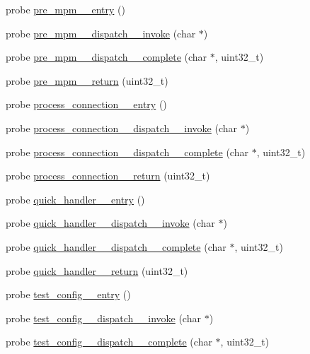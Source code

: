 \begin{DoxyCompactItemize}
probe \hyperlink{apache__probes_8d_acef3144996c242806ff5b2fd6e056fa8}{pre\+\_\+mpm\+\_\+\+\_\+entry} ()
\item 
probe \hyperlink{apache__probes_8d_a305befda60b54d2afe0d12da5d9b9c63}{pre\+\_\+mpm\+\_\+\+\_\+dispatch\+\_\+\+\_\+invoke} (char $\ast$)
\item 
probe \hyperlink{apache__probes_8d_aa11a7675928873dc6046e3c9345983a6}{pre\+\_\+mpm\+\_\+\+\_\+dispatch\+\_\+\+\_\+complete} (char $\ast$, uint32\+\_\+t)
\item 
probe \hyperlink{apache__probes_8d_a611a58f72339eea78df1b71128662991}{pre\+\_\+mpm\+\_\+\+\_\+return} (uint32\+\_\+t)
\item 
probe \hyperlink{apache__probes_8d_abad2b321edb1700248bb25a8cdf3e06a}{process\+\_\+connection\+\_\+\+\_\+entry} ()
\item 
probe \hyperlink{apache__probes_8d_a919f9ad70abb91cb091fbb069b39a741}{process\+\_\+connection\+\_\+\+\_\+dispatch\+\_\+\+\_\+invoke} (char $\ast$)
\item 
probe \hyperlink{apache__probes_8d_aba9a8f6c1b9d1219c49f220ae7e5a1d4}{process\+\_\+connection\+\_\+\+\_\+dispatch\+\_\+\+\_\+complete} (char $\ast$, uint32\+\_\+t)
\item 
probe \hyperlink{apache__probes_8d_a96268b91bf3f758be45fdd2d608378fb}{process\+\_\+connection\+\_\+\+\_\+return} (uint32\+\_\+t)
\item 
probe \hyperlink{apache__probes_8d_a2ff70aae2219c50bff405daa5c96ec34}{quick\+\_\+handler\+\_\+\+\_\+entry} ()
\item 
probe \hyperlink{apache__probes_8d_aa5576677af95346e2af8210ce2ade506}{quick\+\_\+handler\+\_\+\+\_\+dispatch\+\_\+\+\_\+invoke} (char $\ast$)
\item 
probe \hyperlink{apache__probes_8d_a488a3e6bfd3642e08e87e60d199fcadc}{quick\+\_\+handler\+\_\+\+\_\+dispatch\+\_\+\+\_\+complete} (char $\ast$, uint32\+\_\+t)
\item 
probe \hyperlink{apache__probes_8d_a52a4f9056e7e93ff24ad60b4a31d718b}{quick\+\_\+handler\+\_\+\+\_\+return} (uint32\+\_\+t)
\item 
probe \hyperlink{apache__probes_8d_a83d75ab2648c82f2e17cdf4a3b4879b2}{test\+\_\+config\+\_\+\+\_\+entry} ()
\item 
probe \hyperlink{apache__probes_8d_abe28a88d30adab423a1adb9169f51eef}{test\+\_\+config\+\_\+\+\_\+dispatch\+\_\+\+\_\+invoke} (char $\ast$)
\item 
probe \hyperlink{apache__probes_8d_ac18b3906a11eb1176a5ffc6ce9b323c2}{test\+\_\+config\+\_\+\+\_\+dispatch\+\_\+\+\_\+complete} (char $\ast$, uint32\+\_\+t)

\end{DoxyCompactItemize}
